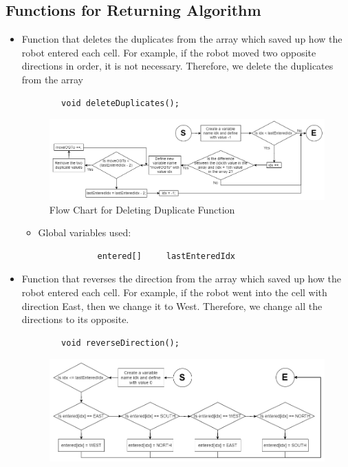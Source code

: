 \documentclass[11pt]{article}
\begin{document}

\subsection{Functions for Returning Algorithm}
\begin{itemize}
\item Function that deletes the duplicates from the array which saved up how the robot entered each cell. For example, if the robot moved two opposite directions in order, it is not necessary. Therefore, we delete the duplicates from the array
 	\begin{verbatim}
		void deleteDuplicates();
	\end{verbatim}
\begin{figure}[htp]
\centering
\includegraphics[scale=0.50]{images/Software_Flowchart/deleteDuplicate.png}
\caption{Flow Chart for Deleting Duplicate Function}
\label{}
\end{figure}
	\begin{itemize}
	\item Global variables used:
 		\begin{verbatim}
			entered[]     lastEnteredIdx
		\end{verbatim}
	\end{itemize}
\item Function that reverses the direction from the array which saved up how the robot entered each cell. For example, if the robot went into the cell with direction East, then we change it to West. Therefore, we change all the directions to its opposite.
 	\begin{verbatim}
		void reverseDirection();
	\end{verbatim}
\begin{figure}[htp]
\centering
\includegraphics[scale=0.50]{images/Software_Flowchart/reverseDirection.png}

\end{figure}
\end{itemize}
\end{document}

